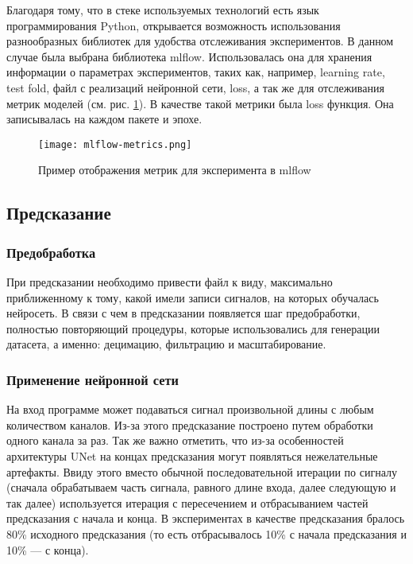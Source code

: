 Благодаря тому, что в стеке используемых технологий есть язык программирования
Python, открывается возможность использования разнообразных библиотек для
удобства отслеживания экспериментов. В данном случае была выбрана библиотека
mlflow. Использовалась она для хранения информации о параметрах экспериментов,
таких как, например, learning rate, test fold, файл с реализаций нейронной
сети, loss, а так же для отслеживания метрик моделей (см. рис.
\ref{fig:mlflow-metrics}). В качестве такой метрики была loss функция. Она
записывалась на каждом пакете и эпохе.

\begin{figure}[!htb]
	\centering
	\caption{Пример отображения метрик для эксперимента в mlflow}
	\texttt{[image: mlflow-metrics.png]}
	\label{fig:mlflow-metrics}
\end{figure}

\subsection{Предсказание}
\subsubsection{Предобработка}

При предсказании необходимо привести файл к виду, максимально приближенному к
тому, какой имели записи сигналов, на которых обучалась нейросеть. В связи с
чем в предсказании появляется шаг предобработки, полностью повторяющий
процедуры, которые использовались для генерации датасета, а именно: децимацию,
фильтрацию и масштабирование.

\subsubsection{Применение нейронной сети}

На вход программе может подаваться сигнал произвольной длины с любым
количеством каналов. Из-за этого предсказание построено путем обработки одного
канала за раз. Так же важно отметить, что из-за особенностей архитектуры UNet
на концах предсказания могут появляться нежелательные артефакты. Ввиду этого
вместо обычной последовательной итерации по сигналу (сначала обрабатываем часть
сигнала, равного длине входа, далее следующую и так далее) используется
итерация с пересечением и отбрасыванием частей предсказания с начала и конца. В
экспериментах в качестве предсказания бралось 80\% исходного предсказания (то
есть отбрасывалось 10\% с начала предсказания и 10\% --- с конца).

